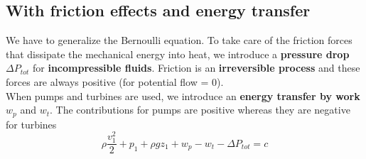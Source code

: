 			\subsection{With friction effects and energy transfer}
				We have to generalize the Bernoulli equation. To take care of the friction forces that dissipate the mechanical energy into heat, we introduce a \textbf{pressure drop} $\Delta P_{tot}$ for \textbf{incompressible fluids}. Friction is an \textbf{irreversible process} and these forces are always positive (for potential flow = 0). \\
				When pumps and turbines are used, we introduce an \textbf{energy transfer by work} $w_p$ and $w_t$. The contributions for pumps are positive whereas they are negative for turbines 
				\begin{equation}
					\rho \frac{v_1^2}{2} + p_1 + \rho gz_1 + w_p -w_t - \Delta P_{tot} = c
				\end{equation}
				
